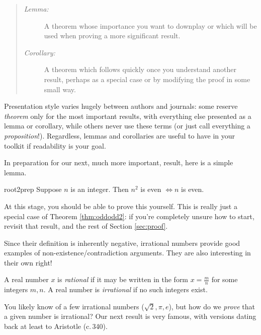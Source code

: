 \begin{quote}
	\begin{description}
	  \item[\normalfont\emph{Lemma:}] A theorem whose importance you want to downplay or which will be used when proving a more significant result. 
	  \item[\normalfont\emph{Corollary:}] A theorem which follows quickly once you understand another result, perhaps as a special case or by modifying the proof in some small way.
	\end{description}
\end{quote}

Presentation style varies hugely between authors and journals: some reserve \emph{theorem} only for the most important results, with everything else presented as a lemma or corollary, while others never use these terms (or just call everything a \emph{proposition}!). Regardless, lemmas and corollaries are useful to have in your toolkit if readability is your goal.\medbreak
 
 
In preparation for our next, much more important, result, here is a simple lemma.

\begin{lemm}{}{root2prep}
	Suppose $n$ is an integer. Then $n^2$ is even $\iff n$ is even.
\end{lemm}

At this stage, you should be able to prove this yourself. This is really just a special case of Theorem \ref{thm:oddodd2}: if you're completely unsure how to start, revisit that result, and the rest of Section \ref{sec:proof}.
 



Since their definition is inherently negative, irrational numbers provide good examples of non-existence/contradiction arguments. They are also interesting in their own right!

\begin{defn}{}{}
	A real number $x$ is \emph{rational} if it may be written in the form $x=\frac mn$ for some integers $m,n$. A real number is \emph{irrational} if no such integers exist.
\end{defn}
 
You likely know of a few irrational numbers ($\sqrt 2,\pi,e$), but how do we \emph{prove} that a given number is irrational? Our next result is very famous, with versions dating back at least to Aristotle (c.\,340\BCE). 

